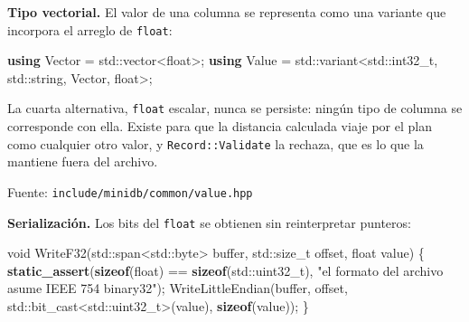 \documentclass[11pt,a4paper]{article}
\newenvironment{Shaded}{}{}
\newcommand{\BuiltInTok}[1]{\textcolor[rgb]{0.00,0.50,0.00}{#1}}
\newcommand{\DataTypeTok}[1]{\textcolor[rgb]{0.56,0.13,0.00}{#1}}
\newcommand{\KeywordTok}[1]{\textcolor[rgb]{0.00,0.44,0.13}{\textbf{#1}}}
\newcommand{\NormalTok}[1]{#1}
\newcommand{\OperatorTok}[1]{\textcolor[rgb]{0.40,0.40,0.40}{#1}}
\newcommand{\StringTok}[1]{\textcolor[rgb]{0.25,0.44,0.63}{#1}}
\begin{document}
\textbf{Tipo vectorial.} El valor de una columna se representa como una
variante que incorpora el arreglo de \texttt{float}:

\begin{Shaded}
\begin{Highlighting}[]
\KeywordTok{using}\NormalTok{ Vector }\OperatorTok{=} \BuiltInTok{std::}\NormalTok{vector}\OperatorTok{\textless{}}\DataTypeTok{float}\OperatorTok{\textgreater{};}
\KeywordTok{using}\NormalTok{ Value }\OperatorTok{=} \BuiltInTok{std::}\NormalTok{variant}\OperatorTok{\textless{}}\BuiltInTok{std::}\NormalTok{int32\_t}\OperatorTok{,} \BuiltInTok{std::}\NormalTok{string}\OperatorTok{,}\NormalTok{ Vector}\OperatorTok{,} \DataTypeTok{float}\OperatorTok{\textgreater{};}
\end{Highlighting}
\end{Shaded}

La cuarta alternativa, \texttt{float} escalar, nunca se persiste: ningún
tipo de columna se corresponde con ella. Existe para que la distancia
calculada viaje por el plan como cualquier otro valor, y
\texttt{Record::Validate} la rechaza, que es lo que la mantiene fuera
del archivo.

Fuente: \texttt{include/minidb/common/value.hpp}

\textbf{Serialización.} Los bits del \texttt{float} se obtienen sin
reinterpretar punteros:

\begin{Shaded}
\begin{Highlighting}[]
\DataTypeTok{void}\NormalTok{ WriteF32}\OperatorTok{(}\BuiltInTok{std::}\NormalTok{span}\OperatorTok{\textless{}}\BuiltInTok{std::}\NormalTok{byte}\OperatorTok{\textgreater{}}\NormalTok{ buffer}\OperatorTok{,} \BuiltInTok{std::}\NormalTok{size\_t offset}\OperatorTok{,} \DataTypeTok{float}\NormalTok{ value}\OperatorTok{)} \OperatorTok{\{}
    \KeywordTok{static\_assert}\OperatorTok{(}\KeywordTok{sizeof}\OperatorTok{(}\DataTypeTok{float}\OperatorTok{)} \OperatorTok{==} \KeywordTok{sizeof}\OperatorTok{(}\BuiltInTok{std::}\NormalTok{uint32\_t}\OperatorTok{),}
                  \StringTok{"el formato del archivo asume IEEE 754 binary32"}\OperatorTok{);}
\NormalTok{    WriteLittleEndian}\OperatorTok{(}\NormalTok{buffer}\OperatorTok{,}\NormalTok{ offset}\OperatorTok{,} \BuiltInTok{std::}\NormalTok{bit\_cast}\OperatorTok{\textless{}}\BuiltInTok{std::}\NormalTok{uint32\_t}\OperatorTok{\textgreater{}(}\NormalTok{value}\OperatorTok{),} \KeywordTok{sizeof}\OperatorTok{(}\NormalTok{value}\OperatorTok{));}
\OperatorTok{\}}
\end{Highlighting}
\end{Shaded}
\end{document}

